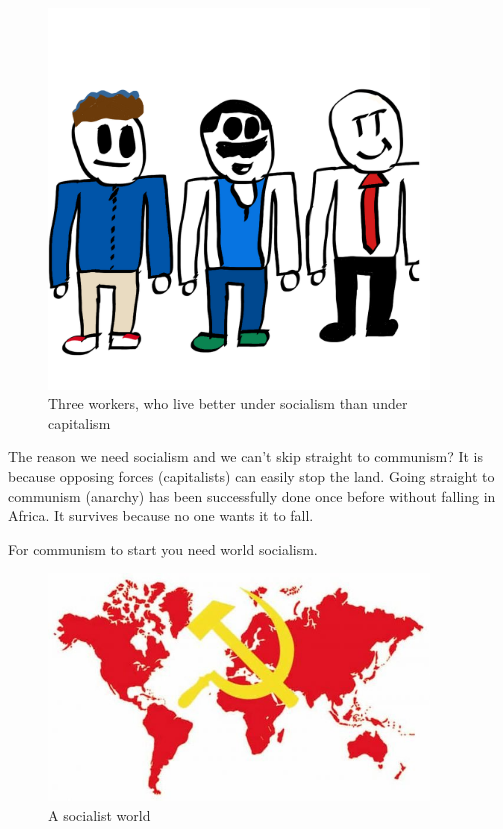 \documentclass[a4paper]{book} %
\begin{document}
\begin{figure}[tbhp]
\centering
\includegraphics[width=0.9\textwidth]{3-2.png}
\caption{Three workers, who live better under socialism than under capitalism}
\end{figure}

The reason we need socialism and we can't skip straight to communism? It is because opposing forces (capitalists) can easily stop the land. Going straight to communism (anarchy) has been successfully done once before without falling in Africa. It survives because no one wants it to fall.

For communism to start you need world socialism.

\begin{figure}[tbhp]
\centering
\includegraphics[width=0.9\textwidth]{3-3.jpg}
\caption{A socialist world}
\end{figure}
\end{document}
